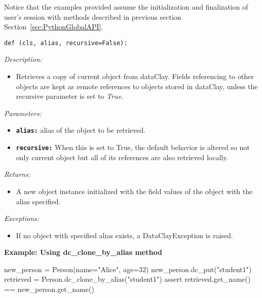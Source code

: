 Notice that the examples provided assume the initialization and finalization of user's session with methods described in previous section Section~\ref{sec:PythonGlobalAPI}.


\begin{dBox}
\texttt{def  (cls, alias, recursive=False):}
\LINE

{\it Description:}

\begin{itemize}
    \item Retrieves a copy of current object from dataClay. Fields referencing to other objects are kept as remote references to objects stored in dataClay, unless the recursive parameter is set to \textit{True}.
\end{itemize}

{\it Parameters:}
\begin{itemize}
    \item \texttt{\bfseries alias:} alias of the object to be retrieved.
    \item \texttt{\bfseries recursive:} When this is set to True, the default behavior is altered so not only current object but all of its references are also retrieved locally.
\end{itemize}

{\it Returns:}

\begin{itemize}
    \item A new object instance initialized with the field values of the object with the alias specified.
\end{itemize}

{\it Exceptions:}

\begin{itemize}
    \item If no object with specified alias exists, a DataClayException is raised.
\end{itemize}

\end{dBox}

\begin{tBox}
\textcolor{basecolor} {\bf Example: Using dc\_clone\_by\_alias method}
\begin{java}
new_person = Person(name="Alice", age=32)
new_person.dc_put("student1")
retrieved = Person.dc_clone_by_alias("student1")
assert retrieved.get_name() == new_person.get_name()
\end{java}
\end{tBox}


